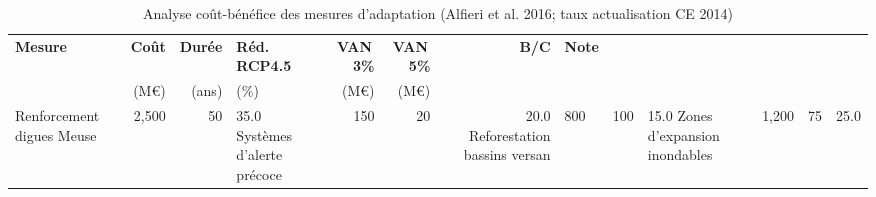 \begin{table}[htbp]
\centering\small
\caption{Analyse co\^ut-b\'en\'efice des mesures d'adaptation (Alfieri et al. 2016; taux actualisation CE 2014)}
\label{tab:adaptation}
\begin{tabular}{p{3cm}rrlrrrl}
\hline
\textbf{Mesure} & \textbf{Co\^ut} & \textbf{Dur\'ee} & \textbf{Réd. RCP4.5} & \textbf{VAN\,3\%} & \textbf{VAN\,5\%} & \textbf{B/C} & \textbf{Note} \\
 & (M\euro) & (ans) & (\%) & (M\euro) & (M\euro) & & \\
\hline
Renforcement digues Meuse & 2,500 & 50 & 35.0%
Systèmes d'alerte précoce & 150 & 20 & 20.0%
Reforestation bassins versan & 800 & 100 & 15.0%
Zones d'expansion inondables & 1,200 & 75 & 25.0%
\hline
\end{tabular}
\end{table}
